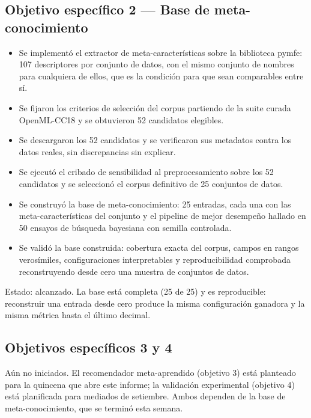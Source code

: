 \documentclass[11pt,letterpaper]{article}
\begin{document}
\subsection{Objetivo específico 2 --- Base de meta-conocimiento}

\begin{itemize}
  \item Se implementó el extractor de meta-características sobre la biblioteca
        pymfe: 107 descriptores por conjunto de datos, con el mismo conjunto de
        nombres para cualquiera de ellos, que es la condición para que sean
        comparables entre sí.
  \item Se fijaron los criterios de selección del corpus partiendo de la suite
        curada OpenML-CC18 y se obtuvieron 52 candidatos elegibles.
  \item Se descargaron los 52 candidatos y se verificaron sus metadatos contra los
        datos reales, sin discrepancias sin explicar.
  \item Se ejecutó el cribado de sensibilidad al preprocesamiento sobre los 52
        candidatos y se seleccionó el corpus definitivo de 25 conjuntos de datos.
  \item Se construyó la base de meta-conocimiento: 25 entradas, cada una con las
        meta-características del conjunto y el pipeline de mejor desempeño hallado
        en 50 ensayos de búsqueda bayesiana con semilla controlada.
  \item Se validó la base construida: cobertura exacta del corpus, campos en
        rangos verosímiles, configuraciones interpretables y reproducibilidad
        comprobada reconstruyendo desde cero una muestra de conjuntos de datos.
\end{itemize}

Estado: alcanzado. La base está completa (25 de 25) y es reproducible: reconstruir
una entrada desde cero produce la misma configuración ganadora y la misma métrica
hasta el último decimal.

\subsection{Objetivos específicos 3 y 4}

Aún no iniciados. El recomendador meta-aprendido (objetivo 3) está planteado para la
quincena que abre este informe; la validación experimental (objetivo 4) está
planificada para mediados de setiembre. Ambos dependen de la base de
meta-conocimiento, que se terminó esta semana.
\end{document}
